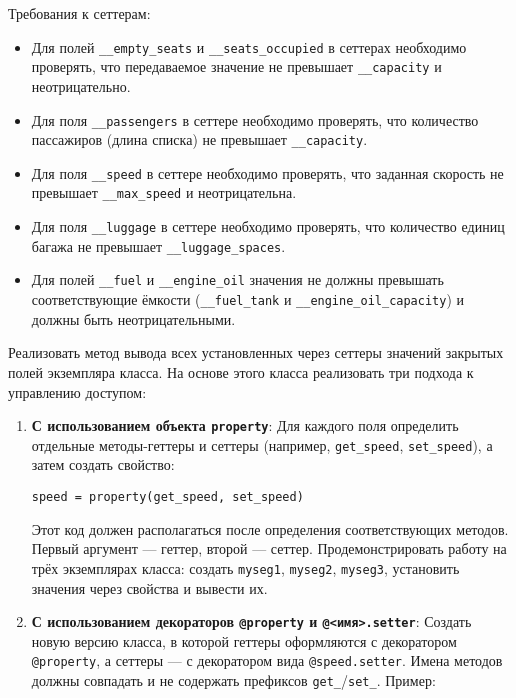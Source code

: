 \begin{enumerate}
\begin{itemize}
\end{itemize}
Требования к сеттерам:
\begin{itemize}
    \item Для полей \texttt{\_\_empty\_seats} и \texttt{\_\_seats\_occupied} в сеттерах необходимо проверять, что передаваемое значение не превышает \texttt{\_\_capacity} и неотрицательно.  
    \item Для поля \texttt{\_\_passengers} в сеттере необходимо проверять, что количество пассажиров (длина списка) не превышает \texttt{\_\_capacity}.  
    \item Для поля \texttt{\_\_speed} в сеттере необходимо проверять, что заданная скорость не превышает \texttt{\_\_max\_speed} и неотрицательна.  
    \item Для поля \texttt{\_\_luggage} в сеттере необходимо проверять, что количество единиц багажа не превышает \texttt{\_\_luggage\_spaces}.
    \item Для полей \texttt{\_\_fuel} и \texttt{\_\_engine\_oil} значения не должны превышать соответствующие ёмкости (\texttt{\_\_fuel\_tank} и \texttt{\_\_engine\_oil\_capacity}) и должны быть неотрицательными.
\end{itemize}
Реализовать метод вывода всех установленных через сеттеры значений закрытых полей экземпляра класса.
На основе этого класса реализовать три подхода к управлению доступом:
\begin{enumerate}
    \item \textbf{С использованием объекта \texttt{property}}:  
    Для каждого поля определить отдельные методы-геттеры и сеттеры (например, \texttt{get\_speed}, \texttt{set\_speed}), а затем создать свойство:  
    \begin{verbatim}
speed = property(get_speed, set_speed)
    \end{verbatim}  
    Этот код должен располагаться после определения соответствующих методов. Первый аргумент — геттер, второй — сеттер.  
    Продемонстрировать работу на трёх экземплярах класса: создать \texttt{myseg1}, \texttt{myseg2}, \texttt{myseg3}, установить значения через свойства и вывести их.
    \item \textbf{С использованием декораторов \texttt{@property} и \texttt{@<имя>.setter}}:  
    Создать новую версию класса, в которой геттеры оформляются с декоратором \texttt{@property}, а сеттеры — с декоратором вида \texttt{@speed.setter}. Имена методов должны совпадать и не содержать префиксов \texttt{get\_}/\texttt{set\_}.  
    Пример:  
    \begin{verbatim}

\end{verbatim}
\end{enumerate}
\end{enumerate}
